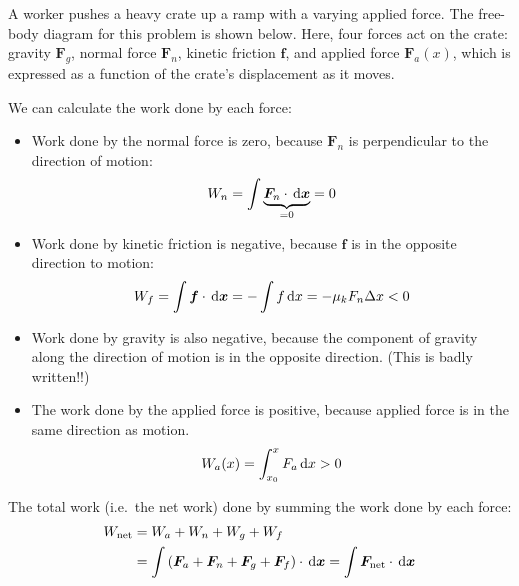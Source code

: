 \begin{example}
  A worker pushes a heavy crate up a ramp with a varying applied force. The
  free-body diagram for this problem is shown below. Here, four forces act on
  the crate: gravity $\bm F_g$, normal force $\bm F_n$, kinetic
  friction $\bm f$, and applied force $\bm F_a(x)$, which is expressed
  as a function of the crate's displacement as it moves.
  \begin{center}
  \end{center}
  We can calculate the work done by each force:
  \begin{itemize}[leftmargin=12pt]
  \item Work done by the normal force is zero, because $\bm F_n$ is
    perpendicular to the direction of motion:
    \begin{equation*}
      W_n=\int\underbrace{\bm F_n\cdot\dl{\bm x}}_{=0}=0
    \end{equation*}
  \item Work done by kinetic friction is negative, because $\bm f$ is in
    the opposite direction to motion:
    \begin{equation*}
      W_f=\int\bm f\cdot\dl{\bm x}=-\int f\dl x=-\mu_k F_n\Delta x<0
    \end{equation*}
  \item Work done by gravity is also negative, because the component of
    gravity along the direction of motion is in the opposite direction.
    (This is badly written!!)
  \item The work done by the applied force is positive, because applied force
    is in the same direction as motion.
    \begin{equation*}
      W_a(x)=\int_{x_0}^x F_a\dl x>0
    \end{equation*}
  \end{itemize}
  The total work (i.e.\ the net work) done by summing the work done by each
  force:
  \begin{align*}
    W_\text{net} &=W_a+W_n+W_g +W_f\\
    &=\int\left(\bm F_a+\bm F_n+\bm F_g+\bm F_f\right)
    \cdot\dl{\bm x} =\int\bm F_\text{net}\cdot\dl{\bm x}
  \end{align*}
\end{example}



